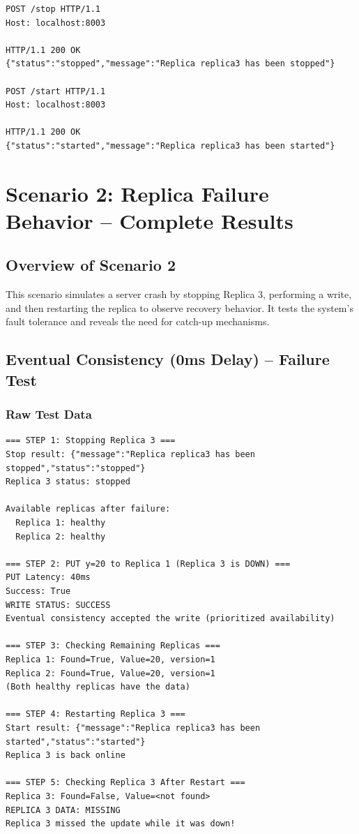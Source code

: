\documentclass[10pt,a4paper]{article}
\begin{document}
\begin{verbatim}
POST /stop HTTP/1.1
Host: localhost:8003

HTTP/1.1 200 OK
{"status":"stopped","message":"Replica replica3 has been stopped"}

POST /start HTTP/1.1
Host: localhost:8003

HTTP/1.1 200 OK
{"status":"started","message":"Replica replica3 has been started"}
\end{verbatim}

\newpage


\section{Scenario 2: Replica Failure Behavior -- Complete Results}

\subsection{Overview of Scenario 2}

This scenario simulates a server crash by stopping Replica 3, performing a write, and then restarting the replica to observe recovery behavior. It tests the system's fault tolerance and reveals the need for catch-up mechanisms.

\subsection{Eventual Consistency (0ms Delay) -- Failure Test}

\subsubsection{Raw Test Data}

\begin{verbatim}
=== STEP 1: Stopping Replica 3 ===
Stop result: {"message":"Replica replica3 has been stopped","status":"stopped"}
Replica 3 status: stopped

Available replicas after failure:
  Replica 1: healthy
  Replica 2: healthy

=== STEP 2: PUT y=20 to Replica 1 (Replica 3 is DOWN) ===
PUT Latency: 40ms
Success: True
WRITE STATUS: SUCCESS
Eventual consistency accepted the write (prioritized availability)

=== STEP 3: Checking Remaining Replicas ===
Replica 1: Found=True, Value=20, version=1
Replica 2: Found=True, Value=20, version=1
(Both healthy replicas have the data)

=== STEP 4: Restarting Replica 3 ===
Start result: {"message":"Replica replica3 has been started","status":"started"}
Replica 3 is back online

=== STEP 5: Checking Replica 3 After Restart ===
Replica 3: Found=False, Value=<not found>
REPLICA 3 DATA: MISSING
Replica 3 missed the update while it was down!
\end{verbatim}
\end{document}
